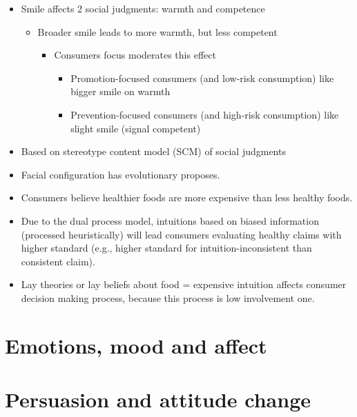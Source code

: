 \documentclass[
]{book}
\begin{document}
\begin{itemize}
\item
  Smile affects 2 social judgments: warmth and competence

  \begin{itemize}
  \item
    Broader smile leads to more warmth, but less competent

    \begin{itemize}
    \item
      Consumers focus moderates this effect

      \begin{itemize}
      \item
        Promotion-focused consumers (and low-risk consumption) like bigger smile on warmth
      \item
        Prevention-focused consumers (and high-risk consumption) like slight smile (signal competent)
      \end{itemize}
    \end{itemize}
  \end{itemize}
\item
  Based on stereotype content model (SCM) of social judgments \citep{fiske2002a}
\item
  Facial configuration has evolutionary proposes.
\end{itemize}

\citep{haws2017}

\begin{itemize}
\item
  Consumers believe healthier foods are more expensive than less healthy foods.
\item
  Due to the dual process model, intuitions based on biased information (processed heuristically) will lead consumers evaluating healthy claims with higher standard (e.g., higher standard for intuition-inconsistent than consistent claim).
\item
  Lay theories or lay beliefs about food = expensive intuition affects consumer decision making process, because this process is low involvement one.
\end{itemize}

\hypertarget{emotions-mood-and-affect}{%
\section{Emotions, mood and affect}\label{emotions-mood-and-affect}}

\hypertarget{persuasion-and-attitude-change}{%
\section{Persuasion and attitude change}\label{persuasion-and-attitude-change}}
\end{document}
